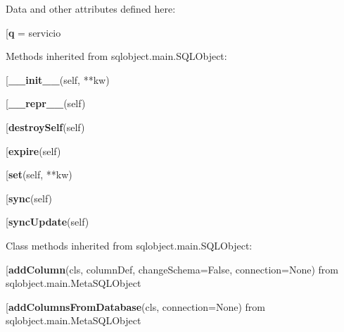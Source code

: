 Data and other attributes defined here:\\
\begin{description}\item[{\bf q} = servicio\end{description}


Methods inherited from sqlobject.main.SQLObject:\\
\begin{description}\item[{\bf \_\_init\_\_}(self, **kw)\end{description}

\begin{description}\item[{\bf \_\_repr\_\_}(self)\end{description}

\begin{description}\item[{\bf destroySelf}(self)\end{description}

\begin{description}\item[{\bf expire}(self)\end{description}

\begin{description}\item[{\bf set}(self, **kw)\end{description}

\begin{description}\item[{\bf sync}(self)\end{description}

\begin{description}\item[{\bf syncUpdate}(self)\end{description}


Class methods inherited from sqlobject.main.SQLObject:\\
\begin{description}\item[{\bf addColumn}(cls, columnDef, changeSchema=False, connection=None) from sqlobject.main.MetaSQLObject\end{description}

\begin{description}\item[{\bf addColumnsFromDatabase}(cls, connection=None) from sqlobject.main.MetaSQLObject\end{description}

